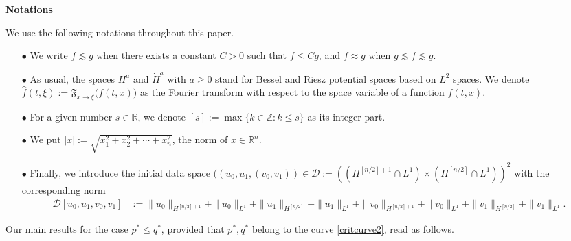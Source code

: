 \documentclass[11pt,reqno]{amsart}
\newcommand{\tron}[1]{\left( #1 \right)}
\numberwithin{equation}{section}
\newcommand{\R}{\mathbb{R}}
\newcommand{\Z}{\mathbb{Z}}
\theoremstyle{plain}
\begin{document}
\textbf{Notations} \medskip

We use the following notations throughout this paper.
\begin{itemize}
\item[$\bullet$] We write $f\lesssim g$ when there exists a constant $C>0$ such that $f\le Cg$, and $f \approx g$ when $g\lesssim f\lesssim g$.
\item[$\bullet$] As usual, the spaces $H^a$ and $\dot{H}^a$ with $a \ge 0$ stand for Bessel and Riesz potential spaces based on $L^2$ spaces. We denote $\widehat{f}(t,\xi):= \mathfrak{F}_{x\rightarrow \xi}\big(f(t,x)\big)$ as the Fourier transform with respect to the space variable of a function $f(t,x)$.
\item[$\bullet$] For a given number $s \in \R$, we denote $[s]:= \max \big\{k \in \Z : k\le s \big\}$ as its integer part.
\item[$\bullet$] We put $|x|:= \sqrt{x_1^2+x_2^2+\cdots+ x_n^2}$, the norm of $x \in \R^n$.
\item[$\bullet$] Finally, we introduce the initial data space $((u_0,u_1,(v_0,v_1))\in \mathcal{D}:=\tron{(H^{[n/2]+1}\cap L^1)\times(H^{[n/2]}\cap L^1)}^2$ with the corresponding norm
\begin{align*}          
\mathcal{D}[u_0,u_1,v_0,v_1] &:=\|u_0\|_{H^{[n/2]+1}}+\|u_0\|_{L^1}+\|u_1\|_{H^{[n/2]}}+\|u_1\|_{L^1}+\|v_0\|_{H^{[n/2]+1}}+\|v_0\|_{L^1}+\|v_1\|_{H^{[n/2]}}+\|v_1\|_{L^1}.
\end{align*}
\end{itemize}

Our main results for the case $p^*\leq q^*$, provided that $p^*,q^*$ belong to the curve \eqref{critcurve2}, read as follows. 
\end{document}
